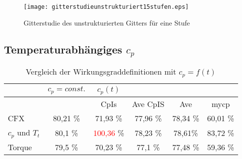 \begin{figure}[htbp]
	\centering
	\texttt{[image: gitterstudieunstrukturiert15stufen.eps]}
	\caption{Gitterstudie des unstrukturierten Gitters für eine Stufe}
	\label{fig:gitterunstrukturiert15stufen}
\end{figure}

\subsection{Temperaturabhängiges $c_p$}
\begin{table}[H]
	\centering
	\caption{Vergleich der Wirkungsgraddefinitionen mit $c_p = f(t)$}
	\begin{tabular}{ l| c | c c c c}
	&	$c_p = const.$	&	$c_p(t)$	&		&		&		\\
	\hline
	&		&	CpIs	&	Ave CpIS	&	Ave	&	mycp	\\
	\hline
CFX	&	80,21 \%	&	71,93 \%	&	77,96 \%	&	78,34 \%	&	60,01 \%	\\
$c_p$ und $T_t$	&	80,1 \%	&	\textcolor{red}{100,36} \%	&	78,23 \%	&	78,61\%	&	83,72 \%	\\
Torque	&	79,5 \%	&	70,23 \%	&	77,1 \%	&	77,48 \%	&	59,36 \%	\\

	\end{tabular}
	\label{tab:unstrukturiertmycp}
\end{table}